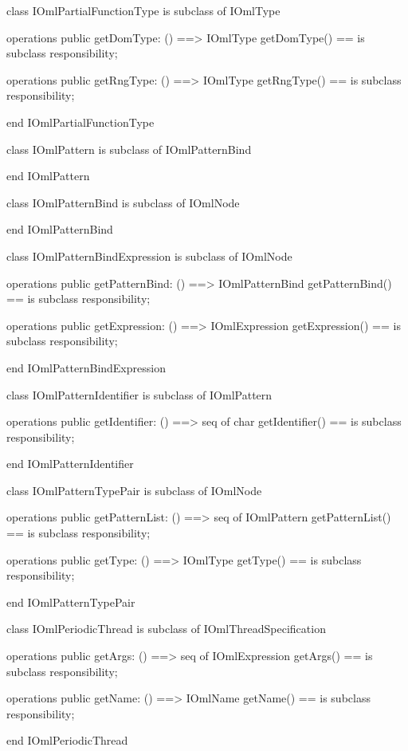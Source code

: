\begin{vdm_al}
class IOmlPartialFunctionType
 is subclass of IOmlType

operations
  public getDomType: () ==> IOmlType
  getDomType() == is subclass responsibility;

operations
  public getRngType: () ==> IOmlType
  getRngType() == is subclass responsibility;

end IOmlPartialFunctionType
\end{vdm_al}

\begin{vdm_al}
class IOmlPattern
 is subclass of IOmlPatternBind

end IOmlPattern
\end{vdm_al}

\begin{vdm_al}
class IOmlPatternBind
 is subclass of IOmlNode

end IOmlPatternBind
\end{vdm_al}

\begin{vdm_al}
class IOmlPatternBindExpression
 is subclass of IOmlNode

operations
  public getPatternBind: () ==> IOmlPatternBind
  getPatternBind() == is subclass responsibility;

operations
  public getExpression: () ==> IOmlExpression
  getExpression() == is subclass responsibility;

end IOmlPatternBindExpression
\end{vdm_al}

\begin{vdm_al}
class IOmlPatternIdentifier
 is subclass of IOmlPattern

operations
  public getIdentifier: () ==> seq of char
  getIdentifier() == is subclass responsibility;

end IOmlPatternIdentifier
\end{vdm_al}

\begin{vdm_al}
class IOmlPatternTypePair
 is subclass of IOmlNode

operations
  public getPatternList: () ==> seq of IOmlPattern
  getPatternList() == is subclass responsibility;

operations
  public getType: () ==> IOmlType
  getType() == is subclass responsibility;

end IOmlPatternTypePair
\end{vdm_al}

\begin{vdm_al}
class IOmlPeriodicThread
 is subclass of IOmlThreadSpecification

operations
  public getArgs: () ==> seq of IOmlExpression
  getArgs() == is subclass responsibility;

operations
  public getName: () ==> IOmlName
  getName() == is subclass responsibility;

end IOmlPeriodicThread
\end{vdm_al}


